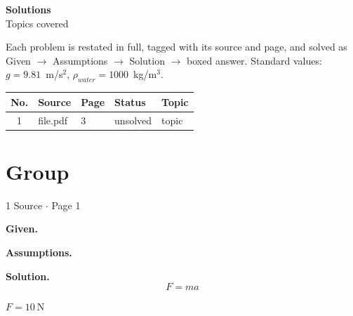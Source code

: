 \documentclass[11pt,a4paper]{article}
\newcommand{\hd}[1]{\par\smallskip\noindent\textbf{#1.}\ }
\begin{document}
\begin{center}
{\LARGE\bfseries %
Solutions}\\[3pt]
{\small %
Topics covered}
\end{center}

\noindent %
Each problem is restated in full, tagged with its source and page, and solved as Given $\rightarrow$ Assumptions $\rightarrow$ Solution $\rightarrow$ boxed answer. Standard values: $g=9.81$~m/s$^2$, $\rho_{water}=1000$~kg/m$^3$.

\medskip
\begin{center}
\small
\begin{tabularx}{\linewidth}{@{}clllX@{}}
\toprule
\textbf{No.} & \textbf{Source} & \textbf{Page} & \textbf{Status} & \textbf{Topic}\\ \midrule
1 & %
file.pdf & 3 & unsolved & topic\\
\bottomrule
\end{tabularx}
\end{center}


\section{%
Group}

\begin{question}{1}{%
Source $\cdot$ Page 1}
\end{question}

\hd{Given} %

\hd{Assumptions} %

\hd{Solution}
\[
F=ma
\]

\begin{answer}
$\boxed{F=10\ \text{N}}$
\end{answer}
\end{document}
